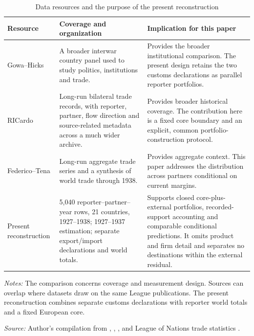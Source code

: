 \begin{table}[!htbp]\centering
\caption{Data resources and the purpose of the present reconstruction}\label{tab:app_data_comparison}
\begin{threeparttable}\small\setlength{\tabcolsep}{4pt}
\begin{tabularx}{\textwidth}{@{}p{}p{}X@{}}
\toprule
Resource & Coverage and organization & Implication for this paper \\
\midrule
Gowa--Hicks \parencite{gowa2013} & A broader interwar country panel used to study politics, institutions and trade. & Provides the broader institutional comparison. The present design retains the two customs declarations as parallel reporter portfolios. \\
RICardo \parencite{dedinger2017} & Long-run bilateral trade records, with reporter, partner, flow direction and source-related metadata across a much wider archive. & Provides broader historical coverage. The contribution here is a fixed core boundary and an explicit, common portfolio-construction protocol. \\
Federico--Tena \parencite{federico2019} & Long-run aggregate trade series and a synthesis of world trade through 1938. & Provides aggregate context. This paper addresses the distribution across partners conditional on current margins. \\
Present reconstruction & 5,040 reporter--partner--year rows, 21 countries, 1927--1938; 1927--1937 estimation; separate export/import declarations and world totals. & Supports closed core-plus-external portfolios, recorded-support accounting and comparable conditional predictions. It omits product and firm detail and separates no destinations within the external residual. \\
\bottomrule
\end{tabularx}
\begin{tablenotes}[flushleft]\footnotesize\item \textit{Notes:} The comparison concerns coverage and measurement design. Sources can overlap where datasets draw on the same League publications. The present reconstruction combines separate customs declarations with reporter world totals and a fixed European core.
\item \textit{Source:} Author's compilation from \textcite{gowa2013}, \textcite{dedinger2017}, \textcite{federico2019}, and League of Nations trade statistics \parencite{league1930,league1936,league1938}.
\end{tablenotes}\end{threeparttable}\end{table}

